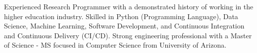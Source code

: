 

\begin{cvparagraph}

Experienced Research Programmer with a demonstrated history of working in the higher education industry. Skilled in Python (Programming Language), Data Science, Machine Learning, Software Development, and Continuous Integration and Continuous Delivery (CI/CD). Strong engineering professional with a Master of Science - MS focused in Computer Science from University of Arizona.
\end{cvparagraph}

\vspace{-0.25cm}
